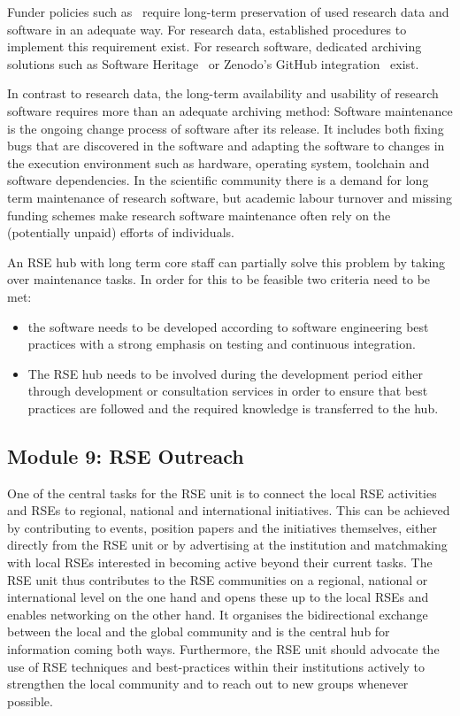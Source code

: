 \documentclass[a4paper]{article}
\begin{document}
Funder policies such as~\autocite{dfg_gsp} require long-term preservation of used research data and software in an adequate way.
For research data, established procedures to implement this requirement exist.
For research software, dedicated archiving solutions such as Software Heritage~\autocite{DiCosmo2020,DiCosmo2023} or Zenodo's GitHub integration~\autocite{GitHubZenodo} exist.

In contrast to research data, the long-term availability and usability of research software requires more than an adequate archiving method:
Software maintenance is the ongoing change process of software after its release.
It includes  both fixing bugs that are discovered in the software and adapting the software to changes in the execution environment such as hardware, operating system, toolchain and software dependencies.
In the scientific community there is a demand for long term maintenance of research software,
but academic labour turnover and missing funding schemes make research software maintenance often rely on the (potentially unpaid) efforts of individuals.

An RSE hub with long term core staff can partially solve this problem by taking over maintenance tasks.
In order for this to be feasible two criteria need to be met:
\begin{itemize}
\item the software needs to be developed according to software engineering best practices with a strong emphasis on testing and continuous integration.
\item The RSE hub needs to be involved during the development period either through development or consultation services in order to ensure that best practices are followed and the required knowledge is transferred to the hub.
\end{itemize}

\subsection{Module 9: RSE Outreach}%
\label{sec:outreach}

One of the central tasks for the RSE unit is to connect the local RSE activities and RSEs to regional, national and international initiatives.
This can be achieved by contributing to events, position papers and the initiatives themselves,
either directly from the RSE unit or by advertising at the institution and matchmaking with local RSEs interested in becoming active beyond their current tasks.
The RSE unit thus contributes to the RSE communities on a regional, national or international level on the one hand and opens these up to the local RSEs and enables networking on the other hand.
It organises the bidirectional exchange between the local and the global community and is the central hub for information coming both ways.
Furthermore, the RSE unit should advocate the use of RSE techniques and best-practices within their institutions actively to strengthen the local community and to reach out to new groups whenever possible.
\end{document}
